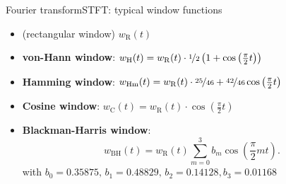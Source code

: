 	\begin{frame}{Fourier transform}{STFT: typical window functions}
        \begin{itemize}
            \item   (rectangular window) $w_\mathrm{R}(t)$
            \smallskip
            \item   \textbf{von-Hann window}: $w_\mathrm{H}(t) = w_\mathrm{R}(t)\cdot\nicefrac{1}{2}\left(1 + \cos\left(\frac{\pi}{2}t\right) \right)$
            \smallskip
            \item   \textbf{Hamming window}: $w_\mathrm{Hm}(t) = w_\mathrm{R}(t)\cdot\nicefrac{25}{46} + \nicefrac{42}{46}\cos\left(\frac{\pi}{2}t\right)$
            \smallskip
            \item   \textbf{Cosine window}: $w_\mathrm{C}(t) = w_\mathrm{R}(t)\cdot\cos\left(\frac{\pi}{2}t\right)$
            \smallskip
            \item   \textbf{Blackman-Harris window}:
                    \begin{equation*}
						w_\mathrm{BH}(t) = w_{\mathrm{R}}(t)\sum\limits_{m=0}^{3}{b_m\cos\left(\frac{\pi}{2}mt\right)} .
					\end{equation*}
                    with $b_0 = 0.35875,\, b_1 = 0.48829,\, b_2 = 0.14128, b_3 = 0.01168$
        \end{itemize}
	\end{frame}	

